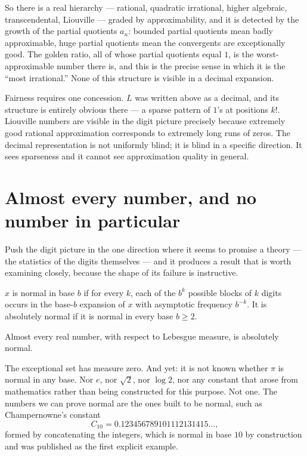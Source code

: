 \documentclass{essay}
\begin{document}
So there is a real hierarchy --- rational, quadratic irrational, higher
algebraic, transcendental, Liouville --- graded by approximability, and it is
detected by the growth of the partial quotients $a_n$: bounded partial
quotients mean badly approximable, huge partial quotients mean the convergents
are exceptionally good. The golden ratio, all of whose partial quotients equal
$1$, is the worst-approximable number there is, and this is the precise sense in
which it is the ``most irrational.'' None of this structure is visible in a
decimal expansion.

Fairness requires one concession. $L$ was written above as a decimal, and its
structure is entirely obvious there --- a sparse pattern of $1$'s at positions
$k!$. Liouville numbers are visible in the digit picture precisely because
extremely good rational approximation corresponds to extremely long runs of
zeros. The decimal representation is not uniformly blind; it is blind in a
specific direction. It sees sparseness and it cannot see approximation quality
in general.

\section{Almost every number, and no number in particular}

Push the digit picture in the one direction where it seems to promise a theory
--- the statistics of the digits themselves --- and it produces a result that is
worth examining closely, because the shape of its failure is instructive.

\begin{definition}
$x$ is normal in base $b$ if for every $k$, each of the $b^k$ possible blocks
of $k$ digits occurs in the base-$b$ expansion of $x$ with asymptotic frequency
$b^{-k}$. It is absolutely normal if it is normal in every base $b \ge 2$.
\end{definition}

\begin{theorem}[Borel, 1909]
Almost every real number, with respect to Lebesgue measure, is absolutely
normal.
\end{theorem}

The exceptional set has measure zero. And yet: it is not known whether $\pi$ is
normal in any base. Nor $e$, nor $\sqrt2$, nor $\log 2$, nor any constant that
arose from mathematics rather than being constructed for this purpose. Not one.
The numbers we can prove normal are the ones built to be normal, such as
Champernowne's constant
\[
  C_{10} = 0.123456789101112131415\ldots,
\]
formed by concatenating the integers, which is normal in base $10$ by
construction and was published as the first explicit example.
\end{document}
